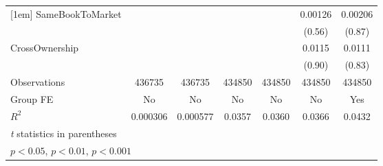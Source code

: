 {\begin{tabular}{l*{6}{c}}
[1em]
SameBookToMarket&                  &                  &                  &                  &  0.00126         &  0.00206         \\
                &                  &                  &                  &                  &   (0.56)         &   (0.87)         \\
[1em]
CrossOwnership  &                  &                  &                  &                  &   0.0115         &   0.0111         \\
                &                  &                  &                  &                  &   (0.90)         &   (0.83)         \\
\hline
Observations    &   436735         &   436735         &   434850         &   434850         &   434850         &   434850         \\
Group FE        &       No         &       No         &       No         &       No         &       No         &      Yes         \\
$ R^2 $         & 0.000306         & 0.000577         &   0.0357         &   0.0360         &   0.0366         &   0.0432         \\
\hline\hline
\multicolumn{7}{l}{\footnotesize \textit{t} statistics in parentheses}\\
\multicolumn{7}{l}{\footnotesize \sym{*} \(p<0.05\), \sym{**} \(p<0.01\), \sym{***} \(p<0.001\)}\\
\end{tabular}
}
